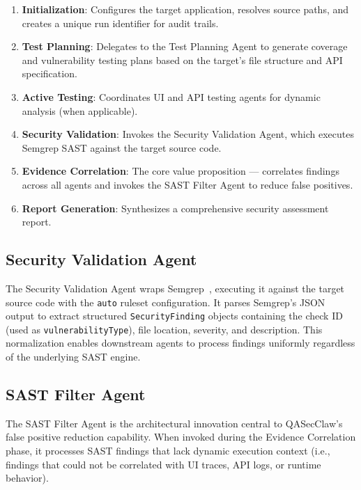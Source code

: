\documentclass[conference]{IEEEtran}
\begin{document}
\begin{enumerate}
    \item \textbf{Initialization}: Configures the target application, resolves source paths, and creates a unique run identifier for audit trails.
    \item \textbf{Test Planning}: Delegates to the Test Planning Agent to generate coverage and vulnerability testing plans based on the target's file structure and API specification.
    \item \textbf{Active Testing}: Coordinates UI and API testing agents for dynamic analysis (when applicable).
    \item \textbf{Security Validation}: Invokes the Security Validation Agent, which executes Semgrep SAST against the target source code.
    \item \textbf{Evidence Correlation}: The core value proposition — correlates findings across all agents and invokes the SAST Filter Agent to reduce false positives.
    \item \textbf{Report Generation}: Synthesizes a comprehensive security assessment report.
\end{enumerate}

\subsection{Security Validation Agent}
The Security Validation Agent wraps Semgrep~\cite{semgrep2023}, executing it against the target source code with the \texttt{auto} ruleset configuration. It parses Semgrep's JSON output to extract structured \texttt{SecurityFinding} objects containing the check ID (used as \texttt{vulnerabilityType}), file location, severity, and description. This normalization enables downstream agents to process findings uniformly regardless of the underlying SAST engine.

\subsection{SAST Filter Agent}
\label{sec:sast-filter}
The SAST Filter Agent is the architectural innovation central to QASecClaw's false positive reduction capability. When invoked during the Evidence Correlation phase, it processes SAST findings that lack dynamic execution context (i.e., findings that could not be correlated with UI traces, API logs, or runtime behavior).
\end{document}
